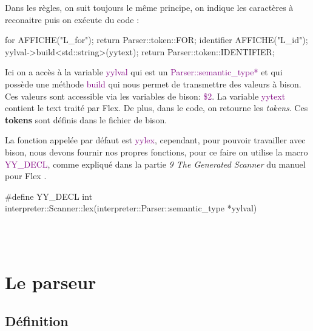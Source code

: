 \documentclass[a4paper]{article}%
\begin{document}
\noindent
Dans les règles, on suit toujours le même principe, on indique les caractères à reconaitre puis on exécute du code :\\

\begin{code}
for          { AFFICHE("L_for"); return Parser::token::FOR; }
{identifier} {
  AFFICHE("L_id");
  yylval->build<std::string>(yytext);
  return Parser::token::IDENTIFIER;
}
\end{code}\leavevmode\newline

\noindent
Ici on a accès à la variable \textcolor{purple}{yylval} qui est un \textcolor{purple}{Parser::semantic\_type*} et qui possède une méthode \textcolor{purple}{build} qui nous permet de transmettre des valeurs à bison.\\
Ces valeurs sont accessible via les variables de bison: \textcolor{purple}{\$2}. La variable
\textcolor{purple}{yytext} contient le text traité par Flex. De plus, dans le code, on retourne
les \textit{tokens}. Ces \textbf{tokens} sont définis dans le fichier de bison.
\newline

La fonction appelée par défaut est \textcolor{purple}{yylex}, cependant, pour pouvoir travailler avec bison, nous devons fournir nos propres fonctions, pour ce faire on utilise la macro \textcolor{purple}{YY\_DECL}, comme expliqué dans la partie \textit{9 The Generated Scanner} du manuel pour Flex \cite{flexmanual}.

\begin{code}
#define YY_DECL int interpreter::Scanner::lex(interpreter::Parser::semantic_type *yylval)
\end{code}\leavevmode\\~\\

\clearpage{}%



\section{Le parseur}%

\subsection{Définition}
\end{document}
